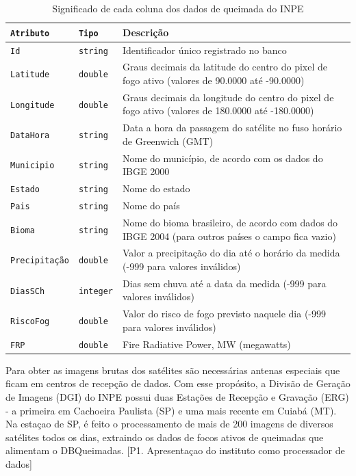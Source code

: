 \documentclass[cic,tc]{iiufrgs}
\begin{document}
\begin{table}[htbp]
\centering
\caption{Significado de cada coluna dos dados de queimada do INPE}
\begin{tabular}{@{}llp{9cm}@{}}
 \toprule
 \texttt{Atributo} & \texttt{Tipo} & Descrição \\
 \midrule
 \texttt{Id} & \texttt{string} & Identificador único registrado no banco \\
 \texttt{Latitude} & \texttt{double} & Graus decimais da latitude do centro 
                     do pixel de fogo ativo (valores de 90.0000 até -90.0000) \\ 
 \texttt{Longitude} & \texttt{double} & Graus decimais da longitude do centro 
                     do pixel de fogo ativo (valores de 180.0000 até -180.0000) \\  
 \texttt{DataHora} & \texttt{string} & Data a hora da passagem do satélite no fuso 
                     horário de Greenwich (GMT) \\   
 \texttt{Municipio} & \texttt{string} & Nome do município, de acordo com os dados 
                     do IBGE 2000 \\
 \texttt{Estado} & \texttt{string} & Nome do estado \\
 \texttt{Pais} & \texttt{string} & Nome do país \\  
 \texttt{Bioma} & \texttt{string} & Nome do bioma brasileiro, de acordo com 
                     dados do IBGE 2004 (para outros países o campo fica vazio) \\
 \texttt{Precipitação} & \texttt{double} & Valor a precipitação do dia até 
                     o horário da medida (-999 para valores inválidos) \\
 \texttt{DiasSCh} & \texttt{integer} & Dias sem chuva até a data da medida 
                     (-999 para valores inválidos) \\
 \texttt{RiscoFog} & \texttt{double} & Valor do risco de fogo previsto naquele dia 
                     (-999 para valores inválidos) \\
 \texttt{FRP} & \texttt{double} & Fire Radiative Power, MW (megawatts) \\
 \bottomrule
\end{tabular}
\label{table:inpeColumns}
\end{table}

Para obter as imagens brutas dos satélites são necessárias antenas especiais que 
ficam em centros de recepção de dados. Com esse propósito, a Divisão de Geração de 
Imagens (DGI) do INPE possui duas Estações de Recepção e Gravação (ERG) - a primeira 
em Cachoeira Paulista (SP) e uma mais recente em Cuiabá (MT). Na estaçao de SP, é 
feito o processamento de mais de 200 imagens de diversos satélites todos os dias, 
extraindo os dados de focos ativos de queimadas que alimentam o DBQueimadas. 
\citep{SiteDGI} [P1. Apresentaçao do instituto como processador de dados] \par
\end{document}

